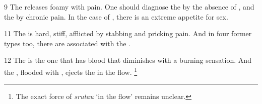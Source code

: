 \begin{translation}
\item [9] The  releases foamy  with pain. 
One should diagnose the  by the absence of 
, and the  by chronic pain.
In the case of , there is an extreme appetite for sex.

\item [11] The  is hard, stiff, afflicted by stabbing and pricking 
pain.
And in four former types too, there are  
associated with the .

\item [12] The  is the one that has blood that 
diminishes with a burning sensation.
And the , flooded with , ejects 
the  in the flow. 
\footnote{%
The exact force of \emph{srutau} ‘in the flow’ remains unclear.%
}


\end{translation}
